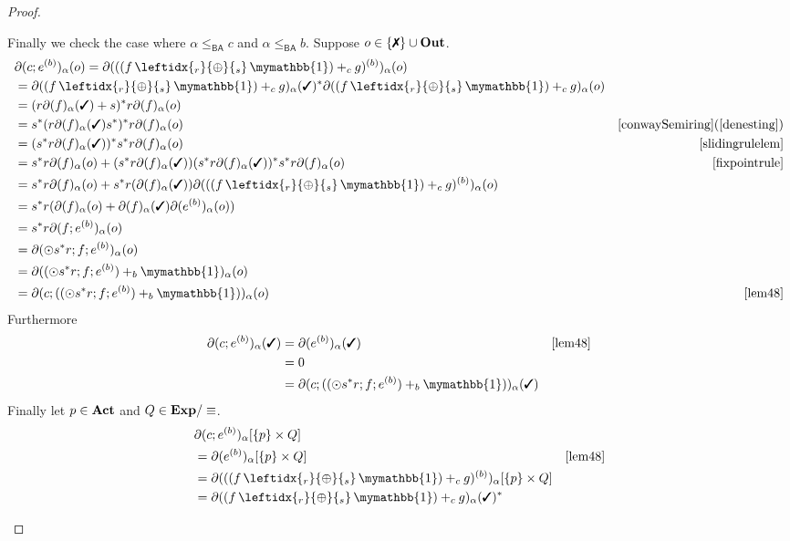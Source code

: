 \documentclass[a4paper,UKenglish,cleveref, autoref, thm-restate]{lipics-v2021}
\newcommand{\cmark}{\text{\ding{51}}}
\newcommand{\xmark}{\text{\ding{55}}}
\newcommand{\Out}{\textbf{\upshape{Out}}}
\newcommand{\Act}{\textbf{\upshape{Act}}}
\newcommand{\Exp}{\textbf{\upshape{Exp}}}
\newcommand{\BA}{\textsf{BA}}
\newcommand{\WC}[2]{\,\leftidx{_{#1}}{{\oplus}}{_{#2}}\,}
\newcommand{\bskip}{\mymathbb{1}}
\theoremstyle{plain}\newtheoremrep{thm}{Theorem}[section]
\begin{document}
\begin{toappendix}
\begin{proof}
\begin{enumerate}
				Finally we check the case where $\alpha \leq_{\BA} c$ and $\alpha \leq_{\BA} b$.			
				Suppose $o \in \{\xmark\}\cup \Out$.
				\begin{align*}
					&\partial(c;e^{(b)})_\alpha(o) = \partial(((f \WC{r}{s} \bskip) +_c g)^{(b)})_\alpha(o)&\\
					&= \partial((f \WC{r}{s} \bskip)+_c g)_\alpha(\cmark)^*\partial((f \WC{r}{s} \bskip)+_c g)_\alpha(o)\\
					&= (r\partial(f)_\alpha(\cmark)+s)^*r\partial(f)_\alpha(o)\\
					&= s^*(r\partial(f)_\alpha(\cmark)s^*)^*r\partial(f)_\alpha(o) & \cref{conwaySemiring} (\ref{denesting})\\
					&= (s^*r\partial(f)_\alpha(\cmark))^*s^*r\partial(f)_\alpha(o) & \cref{slidingrulelem}\\
					&= s^*r\partial(f)_\alpha(o)+(s^*r\partial(f)_\alpha(\cmark))(s^*r\partial(f)_\alpha(\cmark))^*s^*r\partial(f)_\alpha(o) & \cref{fixpointrule}\\
					&= s^*r\partial(f)_\alpha(o)+s^*r(\partial(f)_\alpha(\cmark))\partial(((f \WC{r}{s} \bskip) +_c g)^{(b)})_\alpha(o)\\
					&=s^*r(\partial(f)_\alpha(o) + \partial(f)_\alpha(\cmark)\partial(e^{(b)})_\alpha(o))\\
					&=s^*r\partial(f;e^{(b)})_\alpha(o)\\
					&=\partial(\odot s^*r;f;e^{(b)})_\alpha(o)\\
					&=\partial((\odot s^*r;f;e^{(b)})+_b \bskip)_\alpha(o)\\
					&=\partial(c;((\odot s^*r;f;e^{(b)})+_b \bskip))_\alpha(o) & \cref{lem48}
				\end{align*}
				Furthermore
				\begin{align*}
					\partial(c;e^{(b)})_\alpha(\cmark) &= \partial(e^{(b)})_\alpha(\cmark) & \cref{lem48}\\
					&= 0\\
					&= \partial(c;((\odot s^*r;f;e^{(b)})+_b \bskip))_\alpha(\cmark)
				\end{align*}
				Finally let $p \in \Act$ and $Q \in \Exp/\equiv$.
				\begin{align*}
					&\partial(c;e^{(b)})_\alpha[\{p\} \times Q] \\
					&= \partial(e^{(b)})_\alpha[\{p\} \times Q] & \cref{lem48}\\
					&= \partial(((f \WC{r}{s} \bskip) +_c g)^{(b)})_\alpha[\{p\} \times Q]&\\
					&= \partial((f \WC{r}{s} \bskip)+_c g)_\alpha(\cmark)^*\\

\end{align*}
\end{enumerate}
\end{proof}
\end{toappendix}
\end{document}
